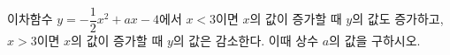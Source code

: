 이차함수 $y=-\dfrac{1}{2}x^2+ax-4$에서 $x<3$이면 $x$의 값이 증가할 때 $y$의 값도 증가하고, $x>3$이면 $x$의 값이 증가할 때 $y$의 값은 감소한다. 이때 상수 $a$의 값을 구하시오.
